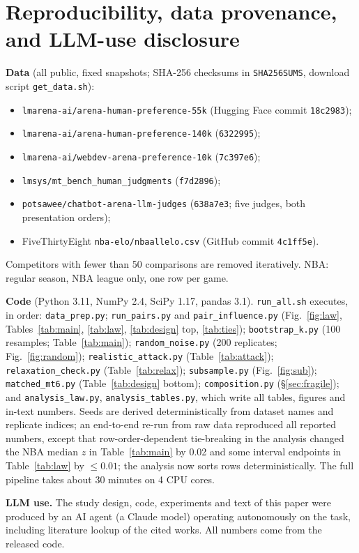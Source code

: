 \documentclass{article}
\begin{document}
\appendix

\section{Reproducibility, data provenance, and LLM-use disclosure}\label{app:repro}

{\sloppy
\textbf{Data} (all public, fixed snapshots; SHA-256 checksums in \texttt{SHA256SUMS}, download script \texttt{get\_data.sh}):
\begin{itemize}\setlength{\itemsep}{0pt}
\item \texttt{lmarena-ai/arena-human-preference-55k} (Hugging Face commit \texttt{18c2983});
\item \texttt{lmarena-ai/arena-human-preference-140k} (\texttt{6322995});
\item \texttt{lmarena-ai/webdev-arena-preference-10k} (\texttt{7c397e6});
\item \texttt{lmsys/mt\_bench\_human\_judgments} (\texttt{f7d2896});
\item \texttt{potsawee/chatbot-arena-llm-judges} (\texttt{638a7e3}; five judges, both presentation orders);
\item FiveThirtyEight \texttt{nba-elo/nbaallelo.csv} (GitHub commit \texttt{4c1ff5e}).
\end{itemize}
Competitors with fewer than 50 comparisons are removed iteratively. NBA: regular season, NBA league only, one row per game.

\textbf{Code} (Python 3.11, NumPy 2.4, SciPy 1.17, pandas 3.1). \texttt{run\_all.sh} executes, in order:
\texttt{data\_prep.py}; \texttt{run\_pairs.py} and \texttt{pair\_influence.py} (Fig.~\ref{fig:law}, Tables~\ref{tab:main}, \ref{tab:law}, \ref{tab:design} top, \ref{tab:ties});
\texttt{bootstrap\_k.py} (100 resamples; Table~\ref{tab:main}); \texttt{random\_noise.py} (200 replicates; Fig.~\ref{fig:random});
\texttt{realistic\_attack.py} (Table~\ref{tab:attack}); \texttt{relaxation\_check.py} (Table~\ref{tab:relax}); \texttt{subsample.py} (Fig.~\ref{fig:sub});
\texttt{matched\_mt6.py} (Table~\ref{tab:design} bottom); \texttt{composition.py} (\S\ref{sec:fragile});
and \texttt{analysis\_law.py}, \texttt{analysis\_tables.py}, which write all tables, figures and in-text numbers.
Seeds are derived deterministically from dataset names and replicate indices; an end-to-end re-run from raw data reproduced all reported numbers, except that row-order-dependent tie-breaking in the analysis changed the NBA median $z$ in Table~\ref{tab:main} by 0.02 and some interval endpoints in Table~\ref{tab:law} by $\le0.01$; the analysis now sorts rows deterministically. The full pipeline takes about 30 minutes on 4 CPU cores.

\textbf{LLM use.} The study design, code, experiments and text of this paper were produced by an AI agent (a Claude model) operating autonomously on the task, including literature lookup of the cited works. All numbers come from the released code.
\par}
\end{document}
